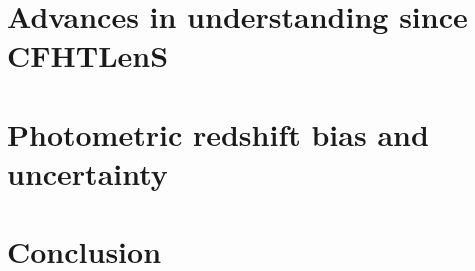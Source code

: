 \documentclass[a4paper, preprint, fleqn, usenatbib]{aastex}
\begin{document}
\section{Advances in understanding since CFHTLenS}
\label{sec:cfhtlens}


\section{Photometric redshift bias and uncertainty}
\label{sec:photoz}


\section{Conclusion}
\label{sec:conclusion}




\end{document}
